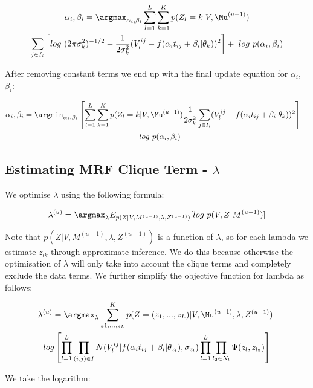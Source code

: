\begin{multline}
 \alpha_i, \beta_i = \argmax_{\alpha_i, \beta_i} \sum_{l=1}^L \sum_{k = 1}^K p(Z_l = k | V, \Mu^{(u-1)}) \\ \sum_{j \in I_i} \left[ log\ (2 \pi \sigma_k^2)^{-1/2} - \frac{1}{2\sigma_k^2}(V_l^{ij} - f(\alpha_i t_{ij} + \beta_i | \theta_k))^2 \right] + \ log\ p(\alpha_i, \beta_i)
\end{multline}

After removing constant terms we end up with the final update equation for $\alpha_i$, $\beta_i$:

\begin{multline}
 \alpha_i, \beta_i = \argmin_{\alpha_i, \beta_i}  \left[ \sum_{l=1}^L \sum_{k=1}^K p(Z_l = k | V, \Mu^{(u-1)}) \frac{1}{2\sigma_k^2} \sum_{j \in I_i} (V_l^{ij} - f(\alpha_i t_{ij} + \beta_i | \theta_k))^2\right] - \\ - log\ p(\alpha_i, \beta_i)
\end{multline}

\subsection{Estimating MRF Clique Term - $\lambda$}

We optimise $\lambda$ using the following formula:

\begin{equation}
\lambda^{(u)} = \argmax_{\lambda} E_{p(Z|V, M^{(u-1)}, \lambda, Z^{(u-1)})}[log\ p(V,Z|M^{(u-1)})]
\end{equation}

Note that $p(Z|V, M^{(u-1)}, \lambda, Z^{(u-1)})$ is a function of $\lambda$, so for each lambda we estimate $z_{lk}$ through approximate inference. We do this because otherwise the optimisation of $\lambda$ will only take into account the clique terms and completely exclude the data terms. We further simplify the objective function for lambda as follows:

\begin{multline}
\lambda^{(u)} = \argmax_{\lambda} \sum_{z1,\dots, z_L}^K p(Z = (z_1, ..., z_L) | V, \Mu^{(u-1)}, \lambda, Z^{(u-1)})\ \\ log \left[ \prod_{l=1}^L \prod_{(i,j) \in I} N(V_l^{ij} | f(\alpha_i t_{ij} + \beta_i | \theta_{z_l}), \sigma_{z_l}) \prod_{l = 1}^{L}\prod_{l_2 \in N_l} \Psi (z_{l}, z_{l_2}) \right]
\end{multline}


We take the logarithm:


